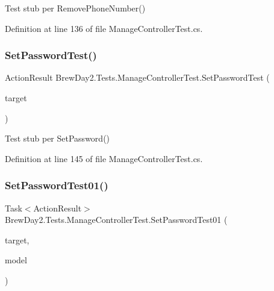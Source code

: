 Test stub per Remove\+Phone\+Number()



Definition at line 136 of file Manage\+Controller\+Test.\+cs.

\mbox{\label{class_brew_day2_1_1_tests_1_1_manage_controller_test_ae9e8878a4839d48b5402c102bf4bd80f}} 
\subsubsection{\texorpdfstring{Set\+Password\+Test()}{SetPasswordTest()}}
{\footnotesize\ttfamily Action\+Result Brew\+Day2.\+Tests.\+Manage\+Controller\+Test.\+Set\+Password\+Test (\begin{DoxyParamCaption}\item[{\mbox{[}\+Pex\+Assume\+Under\+Test\mbox{]} \mbox{\hyperlink{class_brew_day2_1_1_controllers_1_1_manage_controller}{Manage\+Controller}}}]{target }\end{DoxyParamCaption})}



Test stub per Set\+Password()



Definition at line 145 of file Manage\+Controller\+Test.\+cs.

\mbox{\label{class_brew_day2_1_1_tests_1_1_manage_controller_test_afc6cfe682f6735059975b9c34bc9dba0}} 
\subsubsection{\texorpdfstring{Set\+Password\+Test01()}{SetPasswordTest01()}}
{\footnotesize\ttfamily Task$<$Action\+Result$>$ Brew\+Day2.\+Tests.\+Manage\+Controller\+Test.\+Set\+Password\+Test01 (\begin{DoxyParamCaption}\item[{\mbox{[}\+Pex\+Assume\+Under\+Test\mbox{]} \mbox{\hyperlink{class_brew_day2_1_1_controllers_1_1_manage_controller}{Manage\+Controller}}}]{target,  }\item[{\mbox{\hyperlink{class_brew_day2_1_1_models_1_1_set_password_view_model}{Set\+Password\+View\+Model}}}]{model }\end{DoxyParamCaption})}



